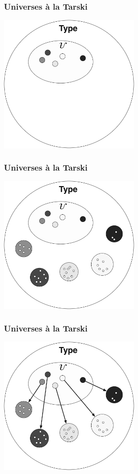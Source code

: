 \documentclass[12pt]{beamer}
\begin{document}
\begin{frame}
  \frametitle{Universes \`a la Tarski}
  \begin{center}
    \includegraphics[width=2.8in]{universe-embedded.pdf}
  \end{center}
\end{frame}

\begin{frame}
  \frametitle{Universes \`a la Tarski}
  \begin{center}
    \includegraphics[width=2.8in]{universe-populated.pdf}
  \end{center}
\end{frame}

\begin{frame}
  \frametitle{Universes \`a la Tarski}
  \begin{center}
    \includegraphics[width=2.8in]{universe-interpretation.pdf}
  \end{center}
\end{frame}
\end{document}
